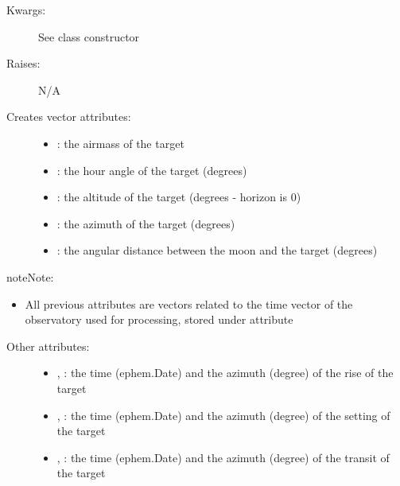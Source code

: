 \documentclass[letterpaper,10pt,english]{sphinxmanual}
\begin{document}
\begin{fulllineitems}
\begin{fulllineitems}
\begin{description}
\begin{itemize}
\end{itemize}

\item[{Kwargs:}] \leavevmode
See class constructor

\item[{Raises:}] \leavevmode
N/A

\item[{Creates vector attributes:}] \leavevmode\begin{itemize}
\item {} 
: the airmass of the target

\item {} 
: the hour angle of the target (degrees)

\item {} 
: the altitude of the target (degrees - horizon is 0)

\item {} 
: the azimuth of the target (degrees)

\item {} 
: the angular distance between the moon and the target (degrees)

\end{itemize}

\end{description}

\begin{notice}{note}{Note:}\begin{itemize}
\item {} 
All previous attributes are vectors related to the time vector of the observatory used for processing, stored under  attribute

\end{itemize}
\end{notice}
\begin{description}
\item[{Other attributes:}] \leavevmode\begin{itemize}
\item {} 
, : the time (ephem.Date) and the azimuth (degree) of the rise of the target

\item {} 
, : the time (ephem.Date) and the azimuth (degree) of the setting of the target

\item {} 
, : the time (ephem.Date) and the azimuth (degree) of the transit of the target


\end{itemize}
\end{description}
\end{fulllineitems}
\end{fulllineitems}
\end{document}
